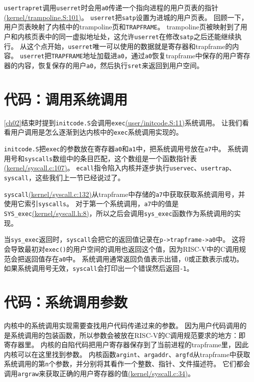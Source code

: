 \texttt{usertrapret}调用\texttt{userret}时会用\texttt{a0}传递一个指向进程的用户页表的指针\href{https://github.com/mit-pdos/xv6-riscv/blob/risc/kernel/trampoline.S#L101}{(kernel/trampoline.S:101)}。
\texttt{userret}把\texttt{satp}设置为进城的用户页表。
回顾一下，用户页表映射了内核中的trampoline页和\texttt{TRAPFRAME}。
trampoline页被映射到了用户和内核页表中的同一虚拟地址处，这允许\texttt{userret}在修改\texttt{satp}之后还能继续执行。
从这个点开始，\texttt{userret}唯一可以使用的数据就是寄存器和trapframe的内容。
\texttt{userret}把\texttt{TRAPFRAME}地址加载进\texttt{a0}，通过\texttt{a0}恢复trapframe中保存的用户寄存器的内容，恢复保存的用户\texttt{a0}，然后执行\texttt{sret}来返回到用户空间。

\section{代码：调用系统调用}
\autoref{ch02}结束时提到\texttt{initcode.S}会调用\texttt{exec}\href{https://github.com/mit-pdos/xv6-riscv/blob/risc/user/initcode.S#L11}{(user/initcode.S:11)}系统调用。
让我们看看用户调用是怎么逐渐到达内核中的\texttt{exec}系统调用实现的。

\texttt{initcode.S}把\texttt{exec}的参数放在寄存器\texttt{a0}和\texttt{a1}中，把系统调用号放在\texttt{a7}中。
系统调用号和\texttt{syscalls}数组中的条目匹配，这个数组是一个函数指针表\href{https://github.com/mit-pdos/xv6-riscv/blob/risc/kernel/syscall.c#L107}{(kernel/syscall.c:107)}。
\texttt{ecall}指令陷入内核并逐步执行\texttt{uservec}、\texttt{usertrap}、\texttt{syscall}，这些我们上一节已经说过了。

\texttt{syscall}\href{https://github.com/mit-pdos/xv6-riscv/blob/risc/kernel/syscall.c#L132}{(kernel/syscall.c:132)}从trapframe中存储的\texttt{a7}中获取获取系统调用号，并使用它索引\texttt{syscalls}。
对于第一个系统调用，\texttt{a7}中的值是\texttt{SYS\_exec}\href{https://github.com/mit-pdos/xv6-riscv/blob/risc/kernel/syscall.h#L8}{(kernel/syscall.h:8)}，所以之后会调用\texttt{sys\_exec}函数作为系统调用的实现。

当\texttt{sys\_exec}返回时，\texttt{syscall}会把它的返回值记录在\texttt{p->trapframe->a0}中。
这将会导致最初对\texttt{exec()}的用户空间的调用也返回这个值，因为RISC-V中的C调用规范会把返回值存在\texttt{a0}中。
系统调用通常返回负值表示出错，0或正数表示成功。
如果系统调用号无效，\texttt{syscall}会打印出一个错误然后返回\texttt{-1}。

\section{代码：系统调用参数}
内核中的系统调用实现需要查找用户代码传递过来的参数。
因为用户代码调用的是系统调用的包装函数，所以参数会被放在RISC-V的C调用规范要求的地方：即寄存器里。
内核的自陷代码把用户寄存器保存到了当前进程的trapframe里，因此内核可以在这里找到参数。
内核函数\texttt{argint}、\texttt{argaddr}、\texttt{argfd}从trapframe中获取系统调用的第\texttt{n}个参数，并分别将其看作一个整数、指针、文件描述符。
它们都会调用\texttt{argraw}来获取正确的用户寄存器的值\href{https://github.com/mit-pdos/xv6-riscv/blob/risc/kernel/syscall.c#L34}{(kernel/syscall.c:34)}。

